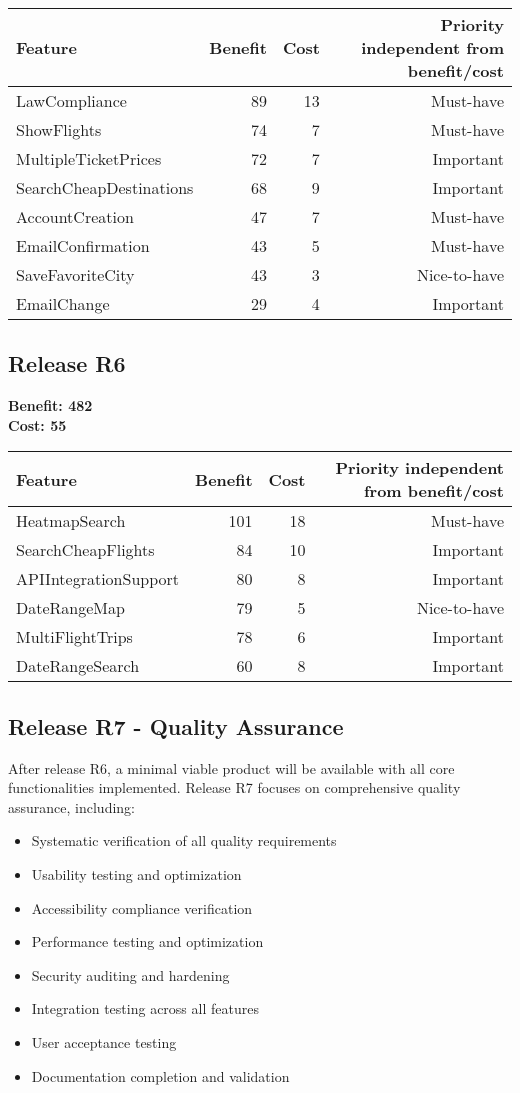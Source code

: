 \begin{tabular}{lrrr}
\toprule
\textbf{Feature} & \textbf{Benefit} & \textbf{Cost} & \textbf{Priority} independent from benefit/cost \\
\midrule
LawCompliance & 89 & 13 & Must-have \\
ShowFlights & 74 & 7 & Must-have \\
MultipleTicketPrices & 72 & 7 & Important \\
SearchCheapDestinations & 68 & 9 & Important \\
AccountCreation & 47 & 7 & Must-have \\
EmailConfirmation & 43 & 5 & Must-have \\
SaveFavoriteCity & 43 & 3 & Nice-to-have \\
EmailChange & 29 & 4 & Important \\
\bottomrule
\end{tabular}

\subsection{Release R6}
\textbf{Benefit: 482} \\
\textbf{Cost: 55} \\

\begin{tabular}{lrrr}
\toprule
\textbf{Feature} & \textbf{Benefit} & \textbf{Cost} & \textbf{Priority} independent from benefit/cost \\
\midrule
HeatmapSearch & 101 & 18 & Must-have \\
SearchCheapFlights & 84 & 10 & Important \\
APIIntegrationSupport & 80 & 8 & Important \\
DateRangeMap & 79 & 5 & Nice-to-have \\
MultiFlightTrips & 78 & 6 & Important \\
DateRangeSearch & 60 & 8 & Important \\
\bottomrule
\end{tabular}

\subsection{Release R7 - Quality Assurance}
After release R6, a minimal viable product will be available with all core functionalities implemented. Release R7 focuses on comprehensive quality assurance, including:

\begin{itemize}
\item Systematic verification of all quality requirements
\item Usability testing and optimization
\item Accessibility compliance verification
\item Performance testing and optimization
\item Security auditing and hardening
\item Integration testing across all features
\item User acceptance testing
\item Documentation completion and validation
\end{itemize}

